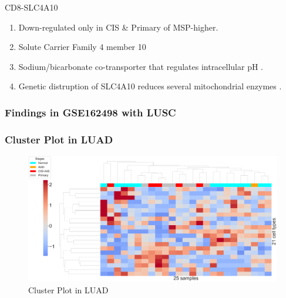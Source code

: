 \documentclass{beamer}
\begin{document}
\begin{frame}[allowframebreaks]
        \begin{block}{CD8-SLC4A10}
            \begin{enumerate}
                \item Down-regulated only in CIS \& Primary of MSP-higher.
                \item Solute Carrier Family 4 member 10
                \item Sodium/bicarbonate co-transporter that regulates intracellular pH \cite{SLC4A10-1}.
                \item Genetic distruption of SLC4A10 reduces several mitochondrial enzymes \cite{SLC4A10-2}.
            \end{enumerate}
        \end{block}
    \end{frame}

    \begin{frame}[allowframebreaks]
        \frametitle{Findings in GSE162498 with LUSC}
    \end{frame}

    \begin{frame}
        \frametitle{Cluster Plot in LUAD}

        \begin{figure}
            \includegraphics[width=0.9 \linewidth]{figures/BisqueRNA/clustermap/STAR.FPKM.GSE162498.ADC.pdf}
            \caption{Cluster Plot in LUAD}
        \end{figure}
    \end{frame}
\end{document}
